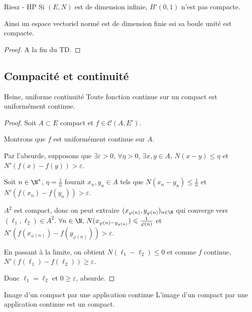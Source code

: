 \begin{theoreme}{Riesz - HP}{}
    Si $(E, N)$ est de dimension infinie, $B'(0, 1)$ n'est pas compacte. 

    Ainsi un espace vectoriel normé est de dimension finie ssi sa boule unité est compacte. 
\end{theoreme}

\begin{proof}
    A la fin du TD.
\end{proof}


\subsection{Compacité et continuité}

\begin{theoreme}{Heine, uniforme continuité}{}
    Toute fonction continue sur un compact est uniformément continue. 
\end{theoreme}


\begin{proof}
    Soit $A \subset E$ compact et $f \in \mathscr C(A, E')$. 

    Montrons que $f$ est uniformément continue sur $A$. 

    Par l'absurde, supposons que $\exists \varepsilon > 0, \, \forall \eta > 0, \, \exists x, y \in A, \, N(x - y) \leqslant \eta$ et $N'(f(x) - f(y)) > \varepsilon$.

    Soit $n \in \N^*$, $\eta = \frac 1 n$ fournit $x_n, y_n \in A$ tels que $N(x_n - y_n) \leqslant \frac 1 n$
    et $N'(f(x_n) - f(y_n)) > \varepsilon$.

    $A^2$ est compact, donc on peut extraire $(x_{\varphi(n)}, y_{\varphi(n)})_{n \in \N}$ qui converge vers $(\ell_1, \ell_2) \in A^2$.
    $\forall n \in \N, \, N(x_{\varphi(n) - y_{\varphi(n)}}) \leqslant \frac 1 {\varphi(n)}$ et $N'(f(x_{\varphi(n)}) - f(y_{\varphi(n)})) > \varepsilon$.

    En passant à la limite, on obtient $N(\ell_1 - \ell_2) \leqslant 0$ et comme $f$ continue, 
    $N'(f(\ell_1) - f(\ell_2)) \geqslant \varepsilon$.

    Donc $\ell_1 = \ell_2$ et $0 \geqslant \varepsilon$, absurde.
\end{proof}

\begin{theoreme}{Image d'un compact par une application continue}{}
    L'image d'un compact par une application continue est un compact. 
\end{theoreme}

